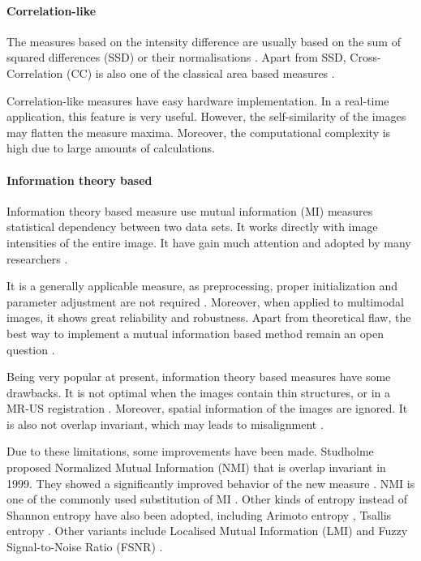 \documentclass{IEEEtran}
\begin{document}
  \paragraph{Correlation-like}

  The measures based on the intensity difference are usually based on the sum of squared differences (SSD) or their normalisations \cite{oliveira2014medical}. Apart from SSD, Cross-Correlation (CC) is also one of the classical area based measures \cite{zheng2013generative, etemadi2014efficient}.

  Correlation-like measures have easy hardware implementation. In a real-time application, this feature is very useful. However, the self-similarity of the images may flatten the measure maxima. Moreover, the computational complexity is high due to large amounts of calculations. \cite{zitova2003image}

  \paragraph{Information theory based}

  Information theory based measure use mutual information (MI) measures statistical dependency between two data sets. It works directly with image intensities of the entire image. It have gain much attention and adopted by many researchers \cite{wang2013novel, vaida2012approach, spanakis2014extended, yamamura2014image, van2013automated, fedorov2012image, wang2013study}.

  It is a generally applicable measure, as preprocessing, proper initialization and parameter adjustment are not required \cite{zitova2003image}. Moreover, when applied to multimodal images, it shows great reliability and robustness. Apart from theoretical flaw, the best way to implement a mutual information based method remain an open question \cite{oliveira2014medical}.

  Being very popular at present, information theory based measures have some drawbacks. It is not optimal when the images contain thin structures, or in a MR-US registration \cite{zitova2003image}. Moreover, spatial information of the images are ignored. It is also not overlap invariant, which may leads to misalignment \cite{oliveira2014medical}.

  Due to these limitations, some improvements have been made. Studholme proposed Normalized Mutual Information (NMI) that is overlap invariant in 1999. They showed a significantly improved behavior of the new measure \cite{studholme1999overlap}. NMI is one of the commonly used substitution of MI \cite{van2013automated, hopp2013automatic, yang2015non}. Other kinds of entropy instead of Shannon entropy have also been adopted, including Arimoto entropy \cite{li20153d}, Tsallis entropy \cite{khader2012information}. Other variants include Localised Mutual Information (LMI) \cite{bron2013image} and Fuzzy Signal-to-Noise Ratio (FSNR) \cite{pan2012medical}.
\end{document}

